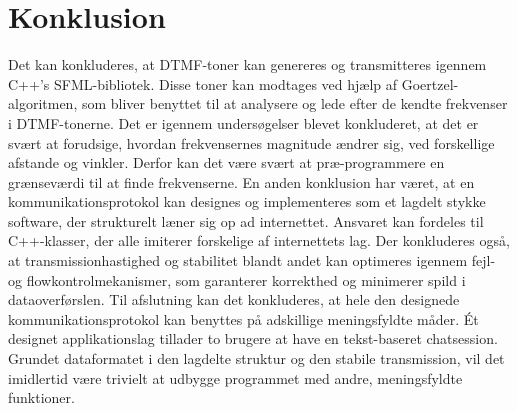 \section{Konklusion}
Det kan konkluderes, at DTMF-toner kan genereres og transmitteres igennem C++'s SFML-bibliotek. Disse toner kan modtages ved hjælp af Goertzel-algoritmen, som bliver benyttet til at analysere og lede efter de kendte frekvenser i DTMF-tonerne. Det er igennem undersøgelser blevet konkluderet, at det er svært at forudsige, hvordan frekvensernes magnitude ændrer sig, ved forskellige afstande og vinkler. Derfor kan det være svært at præ-programmere en grænseværdi til at finde frekvenserne. En anden konklusion har været, at en kommunikationsprotokol kan designes og implementeres som et lagdelt stykke software, der strukturelt læner sig op ad internettet. Ansvaret kan fordeles til  C++-klasser, der alle imiterer forskelige af internettets lag. Der konkluderes også, at transmissionhastighed og stabilitet blandt andet kan optimeres igennem fejl- og flowkontrolmekanismer, som garanterer korrekthed og minimerer spild i dataoverførslen. Til afslutning kan det konkluderes, at hele den designede kommunikationsprotokol kan benyttes på adskillige meningsfyldte måder. Ét designet applikationslag tillader to brugere at have en tekst-baseret chatsession. Grundet dataformatet i den lagdelte struktur og den stabile transmission, vil det imidlertid være trivielt at udbygge programmet med andre, meningsfyldte funktioner.